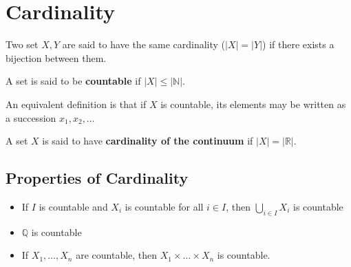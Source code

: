 \documentclass[../../main/main.tex]{subfiles}
\begin{document}
\section{Cardinality}
\label{sec:cardinality}

\begin{definition}
   Two set $X, Y$ are said to have the same cardinality ($|X| = |Y|$) if there exists a bijection between them.
\end{definition}

\begin{definition}
   A set is said to be {\bf countable} if $|X| \leq |\mathbb{N}|$.
\end{definition}


An equivalent definition is that if $X$ is countable, its elements may be written as a succession $x_{1}, x_{2}, \dots$

\begin{definition}
  A set $X$ is said to have {\bf cardinality of the continuum} if $|X| = |\mathbb{R}|$.
\end{definition}

\subsection{Properties of Cardinality}
\label{subsec:prop-cardinality}

\begin{itemize}
    \item If $I$ is countable and $X_{i}$ is countable for all $i \in I$, then $\bigcup_{i \in I} X_{i}$ is countable
    \item $\mathbb{Q}$ is countable
    \item If $X_{1}, \dots, X_{n}$ are countable, then $X_{1} \times \dots \times X_{n}$ is countable.
\end{itemize}
\end{document}
